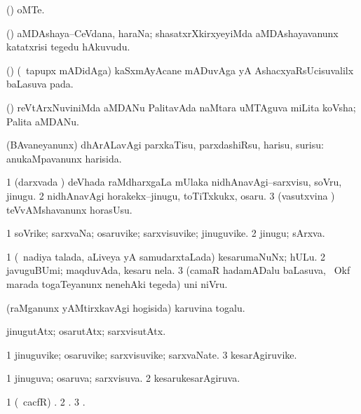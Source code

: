 \bentry
{}
\gl{\nA}
\bmng
(\AMiM) oMTe. 
\emng
\eentry

\bentry
{}
\gl{\nA}
\bmng
(\shaveY) aMDAshaya--CeVdana, haraNa; shasatxrXkirxyeyiMda aMDAshayavanunx katatxrisi tegedu hAkuvudu. 
\emng
\eentry

\bentry
{}
\gl{\BAavayx}
\bmng
(\AmA) (\kanmu\ tapupx mADidAga) kaSxmAyAcane mADuvAga yA AshacxyaRsUcisuvalilx baLasuva pada. 
\emng
\eentry

\bentry
{}
\gl{\nA}
\bmng
(\jiVvi) reVtArxNuviniMda aMDANu PalitavAda naMtara uMTAguva miLita koVsha; Palita aMDANu. 
\emng
\eentry

\bentry
{}
\gl{\sakirx}
\bmng
(BAvaneyanunx) dhArALavAgi parxkaTisu, parxdashiRsu, harisu, surisu:  anukaMpavanunx harisida. 
\emng

\noindent
\gl{\akirx}
\bmng
\bnum
\num{1} (darxvada \vi) deVhada raMdharxgaLa mUlaka nidhAnavAgi--sarxvisu, soVru, jinugu. 
\num{2} nidhAnavAgi horakekx--jinugu, toTiTxkukx, osaru. 
\num{3} (vasutxvina \vi) teVvAMshavanunx horasUsu. 
\enum
\emng
\eentry

\bentry
{}
\gl{\nA}
\bmng
\bnum
\num{1} soVrike; sarxvaNa; osaruvike; sarxvisuvike; jinuguvike. 
\num{2} jinugu; sArxva. 
\enum
\emng
\eentry

\bentry
{}
\gl{\nA}
\bmng
\bnum
\num{1} (\kanmu\ nadiya talada, aLiveya yA samudarxtaLada) kesarumaNuNx; hULu. 
\num{2} javuguBUmi; maqduvAda, kesaru nela. 
\num{3} (camaR hadamADalu baLasuva, \kanmu\ Okf marada togaTeyanunx nenehAki tegeda) uni niVru. 
\enum
\emng
\eentry

\bentry
{}
\gl{\nA}
\bmng
(raMganunx yAMtirxkavAgi hogisida) karuvina togalu. 
\emng
\eentry

\bentry
{}
\gl{\kirxvi}
\bmng
jinugutAtx; osarutAtx; sarxvisutAtx. 
\emng
\eentry

\bentry
{}
\gl{\nA}
\bmng
\bnum
\num{1} jinuguvike; osaruvike; sarxvisuvike; sarxvaNate. 
\num{3} kesarAgiruvike. 
\enum
\emng
\eentry

\bentry
{}
\gl{\gu}
\bmng
\bnum
\num{1} jinuguva; osaruva; sarxvisuva. 
\num{2} kesarukesarAgiruva. 
\enum
\emng
\eentry

\bentry
{}
\gl{\saMkiSx}
\bmng
\bnum
\num{1} (\roVkAyx\ cacfR) . 
\num{2} . 
\num{3} . 
\enum
\emng
\eentry

